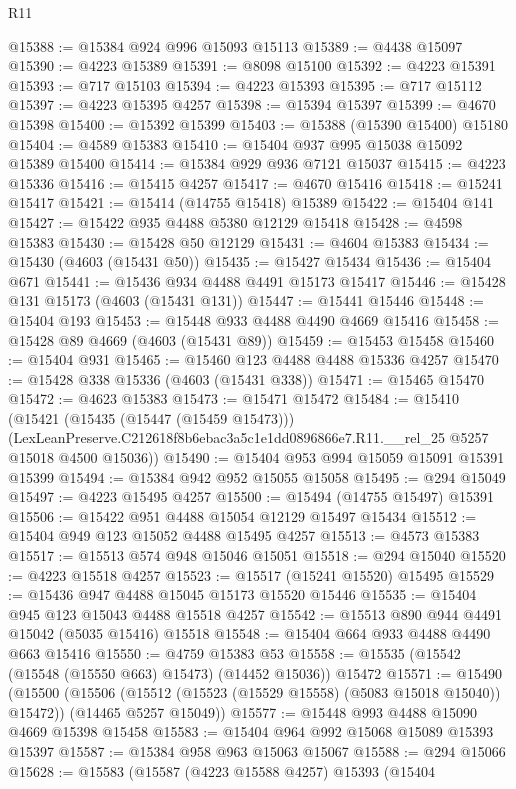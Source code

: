 \begin{lexlean}{R11}
\begin{coremodule}
@15388 := @15384 @924 @996 @15093 @15113
@15389 := @4438 @15097
@15390 := @4223 @15389
@15391 := @8098 @15100
@15392 := @4223 @15391
@15393 := @717 @15103
@15394 := @4223 @15393
@15395 := @717 @15112
@15397 := @4223 @15395 @4257
@15398 := @15394 @15397
@15399 := @4670 @15398
@15400 := @15392 @15399
@15403 := @15388 (@15390 @15400) @15180
@15404 := @4589 @15383
@15410 := @15404 @937 @995 @15038 @15092 @15389 @15400
@15414 := @15384 @929 @936 @7121 @15037
@15415 := @4223 @15336
@15416 := @15415 @4257
@15417 := @4670 @15416
@15418 := @15241 @15417
@15421 := @15414 (@14755 @15418) @15389
@15422 := @15404 @141
@15427 := @15422 @935 @4488 @5380 @12129 @15418
@15428 := @4598 @15383
@15430 := @15428 @50 @12129
@15431 := @4604 @15383
@15434 := @15430 (@4603 (@15431 @50))
@15435 := @15427 @15434
@15436 := @15404 @671
@15441 := @15436 @934 @4488 @4491 @15173 @15417
@15446 := @15428 @131 @15173 (@4603 (@15431 @131))
@15447 := @15441 @15446
@15448 := @15404 @193
@15453 := @15448 @933 @4488 @4490 @4669 @15416
@15458 := @15428 @89 @4669 (@4603 (@15431 @89))
@15459 := @15453 @15458
@15460 := @15404 @931
@15465 := @15460 @123 @4488 @4488 @15336 @4257
@15470 := @15428 @338 @15336 (@4603 (@15431 @338))
@15471 := @15465 @15470
@15472 := @4623 @15383
@15473 := @15471 @15472
@15484 := @15410
    (@15421
      (@15435 (@15447 (@15459 @15473)))
      (LexLeanPreserve.C212618f8b6ebac3a5c1e1dd0896866e7.R11.__rel_25 @5257 @15018 @4500 @15036))
@15490 := @15404 @953 @994 @15059 @15091 @15391 @15399
@15494 := @15384 @942 @952 @15055 @15058
@15495 := @294 @15049
@15497 := @4223 @15495 @4257
@15500 := @15494 (@14755 @15497) @15391
@15506 := @15422 @951 @4488 @15054 @12129 @15497 @15434
@15512 := @15404 @949 @123 @15052 @4488 @15495 @4257
@15513 := @4573 @15383
@15517 := @15513 @574 @948 @15046 @15051
@15518 := @294 @15040
@15520 := @4223 @15518 @4257
@15523 := @15517 (@15241 @15520) @15495
@15529 := @15436 @947 @4488 @15045 @15173 @15520 @15446
@15535 := @15404 @945 @123 @15043 @4488 @15518 @4257
@15542 := @15513 @890 @944 @4491 @15042 (@5035 @15416) @15518
@15548 := @15404 @664 @933 @4488 @4490 @663 @15416
@15550 := @4759 @15383 @53
@15558 := @15535 (@15542 (@15548 (@15550 @663) @15473) (@14452 @15036)) @15472
@15571 := @15490
    (@15500
      (@15506 (@15512 (@15523 (@15529 @15558) (@5083 @15018 @15040)) @15472))
      (@14465 @5257 @15049))
@15577 := @15448 @993 @4488 @15090 @4669 @15398 @15458
@15583 := @15404 @964 @992 @15068 @15089 @15393 @15397
@15587 := @15384 @958 @963 @15063 @15067
@15588 := @294 @15066
@15628 := @15583
    (@15587
      (@4223 @15588 @4257)
      @15393
      (@15404

\end{coremodule}
\end{lexlean}
